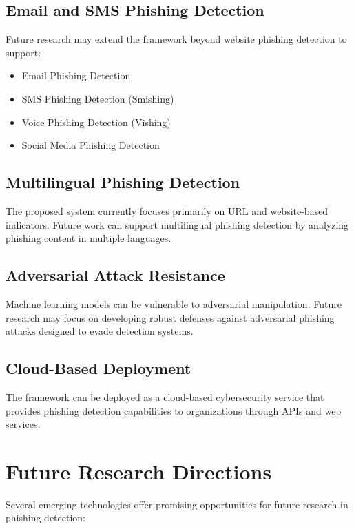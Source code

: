 \documentclass[12pt]{report}
\begin{document}
\subsection{Email and SMS Phishing Detection}

Future research may extend the framework beyond website phishing detection to support:

\begin{itemize}
    \item Email Phishing Detection
    \item SMS Phishing Detection (Smishing)
    \item Voice Phishing Detection (Vishing)
    \item Social Media Phishing Detection
\end{itemize}

\subsection{Multilingual Phishing Detection}

The proposed system currently focuses primarily on URL and website-based indicators. Future work can support multilingual phishing detection by analyzing phishing content in multiple languages.

\subsection{Adversarial Attack Resistance}

Machine learning models can be vulnerable to adversarial manipulation. Future research may focus on developing robust defenses against adversarial phishing attacks designed to evade detection systems.

\subsection{Cloud-Based Deployment}

The framework can be deployed as a cloud-based cybersecurity service that provides phishing detection capabilities to organizations through APIs and web services.

\section{Future Research Directions}

Several emerging technologies offer promising opportunities for future research in phishing detection:
\end{document}

